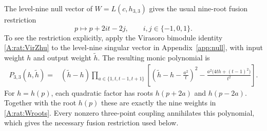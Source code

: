 \documentclass[11pt]{article}
\numberwithin{equation}{section}
\begin{document}
The level-nine null vector of $W=L(c,h_{3,3})$ gives the usual nine-root fusion restriction
\begin{equation}\label{A:rat:Wroots}
 p\longmapsto p+2it-2j,\qquad i,j\in\{-1,0,1\}.
\end{equation}
To see the restriction explicitly, apply the Virasoro bimodule identity \eqref{A:rat:VirZhu} to the level-nine singular vector in Appendix~\ref{app:null}, with input weight $h$ and output weight $\widetilde h$. The resulting monic polynomial is
\begin{equation}\label{A:rat:Wpoly}
\begin{split}
 P_{3,3}(h,\widetilde h)={}&(\widetilde h-h)
 \prod_{a\in\{1,t,t-1,t+1\}}\left[
 \left(\widetilde h-h-\frac{a^2}{t}\right)^2
 -\frac{a^2\bigl(4th+(t-1)^2\bigr)}{t^2}\right].
\end{split}
\end{equation}
For $h=h(p)$, each quadratic factor has roots $h(p+2a)$ and $h(p-2a)$. Together with the root $h(p)$ these are exactly the nine weights in \eqref{A:rat:Wroots}. Every nonzero three-point coupling annihilates this polynomial, which gives the necessary fusion restriction used below.
\end{document}
